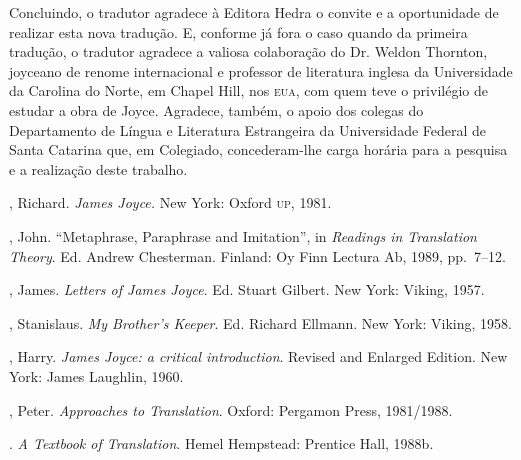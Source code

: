 Concluindo, o tradutor agradece à Editora Hedra o convite e a oportunidade de
realizar esta nova tradução.  E, conforme já fora o caso quando da primeira
tradução, o tradutor agradece a valiosa colaboração do Dr. Weldon Thornton,
joyceano de renome internacional e professor de literatura inglesa da
Universidade da Carolina do Norte, em Chapel Hill, nos \textsc{eua}, com quem teve o
privilégio de estudar a obra de Joyce.  Agradece, também, o apoio dos colegas
do Departamento de Língua e Literatura Estrangeira da Universidade Federal de
Santa Catarina que, em Colegiado, concederam-lhe carga horária para a pesquisa
e a realização deste trabalho.

\begin{bibliohedra}
, Richard. \textit{James Joyce.} New York: Oxford \textsc{up},
1981.

, John. “Metaphrase, Paraphrase and Imitation”, in
\textit{Readings in Translation Theory}. Ed. Andrew Chesterman.  Finland: Oy
Finn Lectura Ab, 1989, pp.~7--12.

, James. \textit{Letters of James Joyce}. Ed. Stuart Gilbert. New
York: Viking, 1957.

, Stanislaus. \textit{My Brother’s Keeper}. Ed. Richard Ellmann.
New York: Viking, 1958.

, Harry. \textit{James Joyce: a critical introduction}. Revised
and Enlarged Edition. New York: James Laughlin, 1960.

, Peter. \textit{Approaches to Translation}. Oxford: Pergamon
Press, 1981/1988.

\titidem. \textit{A Textbook of Translation}. Hemel Hempstead: Prentice Hall,
1988b.

\end{bibliohedra}

